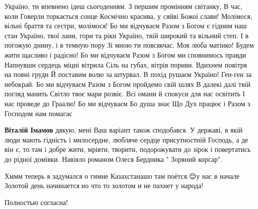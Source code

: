 \begin{itemize}
\begin{itemize}
\begin{multicols}{2}
\obeycr
Україно, ти впевнено ідеш сьогоденням.
З першим промінням світанку,
В час, коли Говерли торкається сонце
Космічно красива, у сяйві Божої слави!
Молімося, вільні браття та сестри, молімося!
Бо ми відчуваєм
Разом з Богом є гідним наш стан
Україно, твої лани, гори та ріки
Україно, твій широкий та вільний степ.
І в погожую днину, і в темную пору
Зі мною ти повсякчас.
Моя люба матінко!
Будем жити щасливо і радісно!
Бо ми відчуваєм
Разом з Богом ми сповнимось правди
Напнувши сердець міцні вітрила
Сіль на губах, вітрів пориви.
Вдихнем повітря на повні груди
Й поставим волю за штурвал.
В похід рушаєм Україно!
Ген-ген за небокрай.
Бо ми відчуваєм
Разом з Богом пройдемо свій шлях
В далекі далі твій погляд манить
Світло твоє мари розвіє.
Всі омани й спокуси для нас освітить
І нас проведе до Граалю!
Бо ми відчуваєм
Бо душа знає
Що Дух працює і
Разом з Господом нам помагає
\restorecr
\end{multicols}


 
\textbf{Віталій Імамов} дякую, мені Ваш варіант також сподобався. У державі, в якій люди мають гідність і милосердне, любляче сердце присутностній Господь, а де він є, то там і добре жити, мріяти, творити, подорожувати до зірок і повертатись до рідної домівки. Навіяло романом Олеся Бердника " Зоряний корсар".
\end{itemize}

 
Хммм теперь я задумался о гимне Казахстана\Laughey[1.0][white]шо там поётся.😌у нас в начале Золотой день начинается\Laughey[1.0][white]🤪но что то золотом и не пахнет у народа!

 
Полностью согласна!

\end{itemize}

